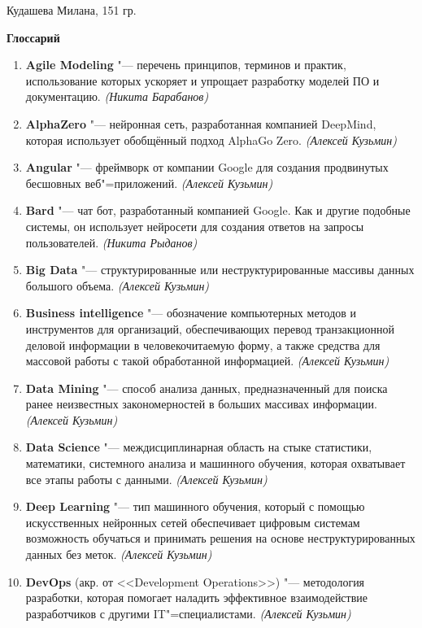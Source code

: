 \documentclass[14pt, a4paper]{extarticle}
\begin{document}
\begin{flushright}
  Кудашева Милана, 151 гр.
\end{flushright}
\begin{center}
    \Large \textbf{Глоссарий}
\end{center}

\begin{enumerate}
    \item \textbf{Agile Modeling} "--- перечень принципов, терминов и практик, использование которых ускоряет и упрощает разработку моделей ПО и документацию. \textit{(Никита Барабанов)}
    \item \textbf{AlphaZero} "--- нейронная сеть, разработанная компанией DeepMind, которая использует обобщённый подход AlphaGo Zero. \textit{(Алексей Кузьмин)}
    \item \textbf{Angular} "--- фреймворк от компании Google для создания продвинутых бесшовных веб"=приложений. \textit{(Алексей Кузьмин)}
    \item \textbf{Bard} "--- чат бот, разработанный компанией Google. Как и другие подобные системы, он использует нейросети для создания ответов на запросы пользователей. \textit{(Никита Рыданов)}
    \item \textbf{Big Data} "--- структурированные или неструктурированные массивы данных большого объема. \textit{(Алексей Кузьмин)}
    \item \textbf{Business intelligence} "--- обозначение компьютерных методов и инструментов для организаций, обеспечивающих перевод транзакционной деловой информации в человекочитаемую форму, а также средства для массовой работы с такой обработанной информацией. \textit{(Алексей Кузьмин)}
    \item \textbf{Data Mining} "--- способ анализа данных, предназначенный для поиска ранее неизвестных закономерностей в больших массивах информации. \textit{(Алексей Кузьмин)}
    \item \textbf{Data Science} "--- междисциплинарная область на стыке статистики, математики, системного анализа и машинного обучения, которая охватывает все этапы работы с данными. \textit{(Алексей Кузьмин)}
    \item \textbf{Deep Learning} "--- тип машинного обучения, который с помощью искусственных нейронных сетей обеспечивает цифровым системам возможность обучаться и принимать решения на основе неструктурированных данных без меток. \textit{(Алексей Кузьмин)}
    \item \textbf{DevOps} (акр. от <<Development Operations>>) "--- методология разработки, которая помогает наладить эффективное взаимодействие разработчиков с другими IT"=специалистами. \textit{(Алексей Кузьмин)}

\end{enumerate}
\end{document}
